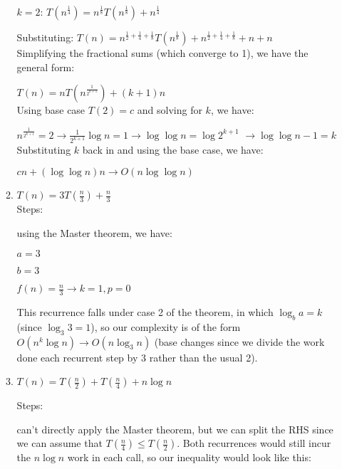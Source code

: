 \documentclass[12pt]{article}
\begin{document}
\begin{enumerate}
\begin{enumerate}
        $k = 2$: $T(n^\frac{1}{4}) = n^\frac{1}{8}T(n^\frac{1}{8}) + n^\frac{1}{4}$

        Substituting: $T(n) = n^{\frac{1}{2} + \frac{1}{4} + \frac{1}{8}}T(n^\frac{1}{8}) + n^{\frac{1}{2} + \frac{1}{4} + \frac{1}{8}} + n + n$\\

        Simplifying the fractional sums (which converge to 1), we have the general form:

        $T(n) = nT(n^\frac{1}{2^{k + 1}}) + (k + 1)n$\\

        Using base case $T(2) = c$ and solving for $k$, we have:

        $n^\frac{1}{2^{k + 1}} = 2 \longrightarrow \frac{1}{2^{k + 1}}\log n = 1 \longrightarrow \log\log n = \log2^{k + 1}$
        $\longrightarrow \log\log n - 1 = k$\\

        Substituting $k$ back in and using the base case, we have:

        $cn + (\log\log n)n \longrightarrow O(n\log\log n)$\\
        
        \item $T(n) = 3T(\frac{n}{3}) + \frac{n}{3}$ \\
        
        Steps:
        
        using the Master theorem, we have:
        
        $a = 3$
        
        $b = 3$
        
        $f(n) = \frac{n}{3} \longrightarrow k = 1, p = 0$
        
        This recurrence falls under case 2 of the theorem, in which $\log_{b}{a} = k$ (since $\log_{3}{3} = 1$), so our 
        complexity is of the form $O(n^k \log n) \longrightarrow O(n\log_{3}{n})$ (base changes since we divide the work 
        done each recurrent step by 3 rather than the usual 2).\\
        
        \item $T(n) = T(\frac{n}{2}) + T(\frac{n}{4}) + n\log n$
        
        Steps:

        can't directly apply the Master theorem, but we can split the RHS since we can assume that $T(\frac{n}{4}) \leq T(\frac{n}{2})$. 
        Both recurrences would still incur the $n\log n$ work in each call, so our inequality would look like this:


\end{enumerate}
\end{enumerate}
\end{document}
